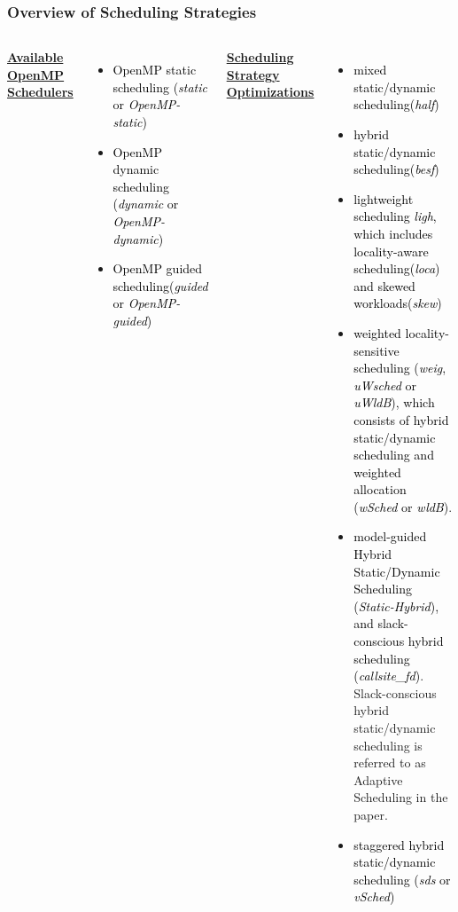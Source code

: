
\begin{frame}
\frametitle{Overview of Scheduling Strategies}
\begin{columns}
       {\tiny \underline{\textbf{Available OpenMP Schedulers}}} \\
       \begin{itemize}
         \tiny \item \tiny \textcolor{black}{OpenMP static scheduling (\textit{static} or \textit{OpenMP-static})}\\ 
       \item \tiny \textcolor{black}{OpenMP dynamic scheduling (\textit{dynamic} or \textit{OpenMP-dynamic})}\\
       \item \tiny  \textcolor{black} {OpenMP guided scheduling(\textit{guided} or \textit{OpenMP-guided})}\\
       \end{itemize}
           {\tiny  \underline{\textbf{Scheduling Strategy Optimizations}}}\\
           \begin{itemize}
             \tiny \item \tiny \textcolor{black}{mixed static/dynamic scheduling(\textit{half})}
           \item \tiny \textcolor{black}{hybrid static/dynamic scheduling(\textit{besf})}
           \item \tiny \textcolor{black} {lightweight scheduling \textit{ligh}, which includes locality-aware scheduling(\textit{loca}) and skewed workloads(\textit{skew})}
           \item \tiny \textcolor{black} {weighted locality-sensitive scheduling (\textit{weig}, \textit{uWsched} or
             \textit{uWldB}), which consists of hybrid static/dynamic
             scheduling and weighted allocation (\textit{wSched} or \textit{wldB})}.
           \item \tiny \textcolor{black} {model-guided Hybrid
             Static/Dynamic Scheduling (\textit{Static-Hybrid}), and
             slack-conscious hybrid scheduling
             (\textit{callsite\_fd})}. Slack-conscious
             hybrid static/dynamic scheduling is referred to as Adaptive Scheduling in the paper.  
           \item \tiny \textcolor{black} {staggered hybrid static/dynamic scheduling (\textit{sds} or \textit{vSched})}

\end{itemize}
\end{columns}
\end{frame}
